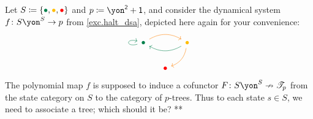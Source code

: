 \documentclass[Book-Poly]{subfiles}
\begin{document}

\begin{example}\label{ex.cofree_dyn_sys}
Let $S\coloneqq\{\bul[dgreen],\bul[dyellow],\bul[red]\}$ and $p\coloneqq\yon^\2+\1$, and consider the dynamical system $f\colon S\yon^S\to p$ from \cref{exc.halt_dsa}, depicted here again for your convenience:
\[
\begin{tikzcd}[column sep=small]
	\bul[dgreen]\ar[rr, bend left, orange]\ar[loop left, dgreen]&&
	\bul[dyellow]\ar[dl, bend left, orange]\ar[ll, dgreen, bend left]\\&
	\bul[red]
\end{tikzcd}
\]
The polynomial map $f$ is supposed to induce a cofunctor $F\colon S\yon^S\cof\cofree{p}$ from the state category on $S$ to the category of $p$-trees. Thus to each state $s\in S$, we need to associate a tree; which should it be? 
**
\end{example}




\end{document}
